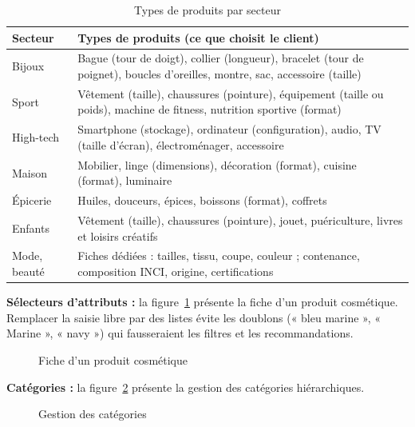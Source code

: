 \begin{table}[H]
\centering
\renewcommand{\arraystretch}{1.3}
\small
\begin{tabular}{|p{2.4cm}|p{12.4cm}|}
\hline
\textbf{Secteur} & \textbf{Types de produits (ce que choisit le client)} \\
\hline
Bijoux & Bague (tour de doigt), collier (longueur), bracelet (tour de poignet), boucles d'oreilles, montre, sac, accessoire (taille) \\
\hline
Sport & Vêtement (taille), chaussures (pointure), équipement (taille ou poids), machine de fitness, nutrition sportive (format) \\
\hline
High-tech & Smartphone (stockage), ordinateur (configuration), audio, TV (taille d'écran), électroménager, accessoire \\
\hline
Maison & Mobilier, linge (dimensions), décoration (format), cuisine (format), luminaire \\
\hline
Épicerie & Huiles, douceurs, épices, boissons (format), coffrets \\
\hline
Enfants & Vêtement (taille), chaussures (pointure), jouet, puériculture, livres et loisirs créatifs \\
\hline
Mode, beauté & Fiches dédiées : tailles, tissu, coupe, couleur ; contenance, composition INCI, origine, certifications \\
\hline
\end{tabular}
\caption{Types de produits par secteur}
\label{tab:types-produit}
\end{table}

\textbf{Sélecteurs d'attributs :} la figure~\ref{fig:ui-attributs} présente la fiche d'un produit cosmétique. Remplacer la saisie libre par des listes évite les doublons (« bleu marine », « Marine », « navy ») qui fausseraient les filtres et les recommandations.
\begin{figure}[H]
    \centering
    \caption{Fiche d'un produit cosmétique}
    \label{fig:ui-attributs}
\end{figure}

\textbf{Catégories :} la figure~\ref{fig:ui-categories} présente la gestion des catégories hiérarchiques.
\begin{figure}[H]
    \centering
    \caption{Gestion des catégories}
    \label{fig:ui-categories}
\end{figure}

